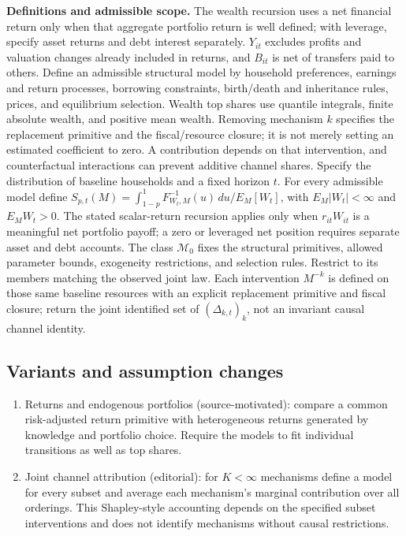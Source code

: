 \documentclass[11pt,a4paper]{article}
\begin{document}
\textbf{Definitions and admissible scope.} The wealth recursion uses a net financial return only when that aggregate portfolio return is well defined; with leverage, specify asset returns and debt interest separately. \(Y_{it}\) excludes profits and valuation changes already included in returns, and \(B_{it}\) is net of transfers paid to others. Define an admissible structural model by household preferences, earnings and return processes, borrowing constraints, birth/death and inheritance rules, prices, and equilibrium selection. Wealth top shares use quantile integrals, finite absolute wealth, and positive mean wealth. Removing mechanism \(k\) specifies the replacement primitive and the fiscal/resource closure; it is not merely setting an estimated coefficient to zero. A contribution depends on that intervention, and counterfactual interactions can prevent additive channel shares. Specify the distribution of baseline households and a fixed horizon \(t\). For every admissible model define \(S_{p,t}(M)=\int_{1-p}^1F^{-1}_{W_t,M}(u)\,du/E_M[W_t]\), with \(E_M|W_t|<\infty\) and \(E_MW_t>0\). The stated scalar-return recursion applies only when \(r_{it}W_{it}\) is a meaningful net portfolio payoff; a zero or leveraged net position requires separate asset and debt accounts. The class \(\mathcal M_0\) fixes the structural primitives, allowed parameter bounds, exogeneity restrictions, and selection rules. Restrict to its members matching the observed joint law. Each intervention \(M^{-k}\) is defined on those same baseline resources with an explicit replacement primitive and fiscal closure; return the joint identified set of \((\Delta_{k,t})_k\), not an invariant causal channel identity.
\subsection*{Variants and assumption changes}
\begin{enumerate}
\item Returns and endogenous portfolios (source-motivated): compare a common risk-adjusted return primitive with heterogeneous returns generated by knowledge and portfolio choice. Require the models to fit individual transitions as well as top shares.
\item Joint channel attribution (editorial): for \(K<\infty\) mechanisms define a model for every subset and average each mechanism's marginal contribution over all orderings. This Shapley-style accounting depends on the specified subset interventions and does not identify mechanisms without causal restrictions.
\end{enumerate}
\end{document}
